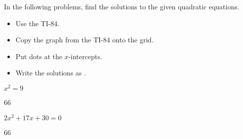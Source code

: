 In the following problems,
find the solutions to the given quadratic equations.
\vspace{-0.5\baselineskip}
\begin{itemize}[nosep]
    \item Use the TI-84.
    \item Copy the graph from the TI-84 onto the grid.
    \item Put dots at the $x$-intercepts.
    \item Write the solutions as .
\end{itemize}


{
    $ x^2 = 9 $\\[2\baselineskip]
    \begin{myTikzpictureGrid}{0.4} {6}{6}
    \end{myTikzpictureGrid}
    \vspace{1in}
}


{
    $ 2x^2 + 17x + 30 = 0 $\\[2\baselineskip]
    \begin{myTikzpictureGrid}{0.4} {6}{6}
    \end{myTikzpictureGrid}
    \vspace{1in}
}

